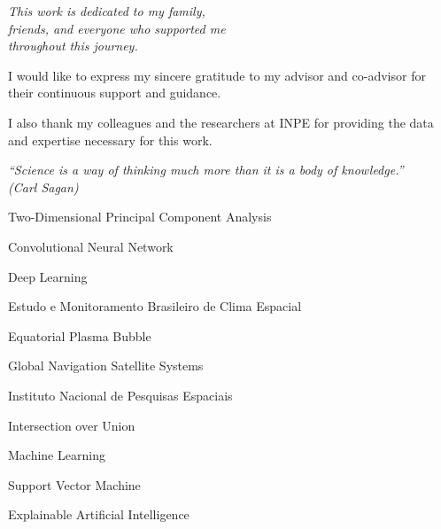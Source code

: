 \documentclass[
   12pt,
   oneside,
   a4paper,
   english,
   brazil
]{abntex2}
\begin{document}

\pretextual

\imprimircapa
\imprimirfolhaderosto*

\begin{dedicatoria}
   \vspace*{\fill}
   \centering
   \noindent
   \textit{This work is dedicated to my family, \\
   friends, and everyone who supported me \\
   throughout this journey.} \vspace*{\fill}
\end{dedicatoria}

\begin{agradecimentos}
   \noindent
   I would like to express my sincere gratitude to my advisor and co-advisor for their continuous support and guidance.   

   \noindent I also thank my colleagues and the researchers at INPE for providing the data and expertise necessary for this work.
\end{agradecimentos}

\begin{epigrafe}
    \vspace*{\fill}
    \begin{flushright}
        \textit{``Science is a way of thinking much more than it is a body of knowledge.''\\
        (Carl Sagan)}
    \end{flushright}
\end{epigrafe}




\listoffigures*
\cleardoublepage

\listoftables*
\cleardoublepage

\begin{siglas}
  \item[2DPCA] Two-Dimensional Principal Component Analysis
  \item[CNN] Convolutional Neural Network
  \item[DL] Deep Learning
  \item[EMBRACE] Estudo e Monitoramento Brasileiro de Clima Espacial
  \item[EPB] Equatorial Plasma Bubble
  \item[GNSS] Global Navigation Satellite Systems
  \item[INPE] Instituto Nacional de Pesquisas Espaciais
  \item[IoU] Intersection over Union
  \item[ML] Machine Learning
  \item[SVM] Support Vector Machine
  \item[XAI] Explainable Artificial Intelligence
\end{siglas}
\end{document}
